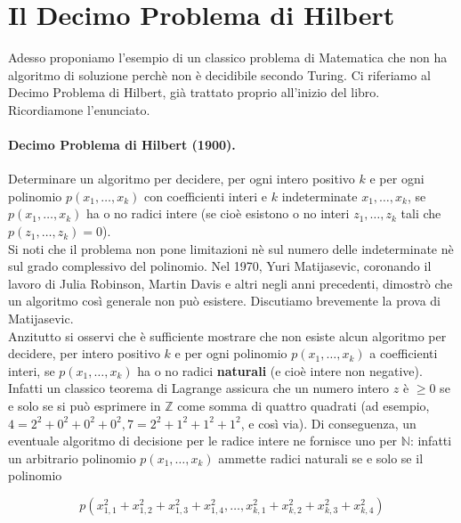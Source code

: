 \section{Il Decimo Problema di Hilbert}

Adesso proponiamo l'esempio di un classico problema di Matematica che non ha
algoritmo di soluzione perchè non è decidibile secondo Turing. Ci riferiamo al Decimo
Problema di Hilbert, già trattato proprio all'inizio del libro. Ricordiamone
l'enunciato.

\paragraph{Decimo Problema di Hilbert (1900).}
Determinare un algoritmo per decidere, per ogni intero positivo $k$ e per ogni
polinomio $p\left(x_1, \ldots, x_k\right)$ con coefficienti interi e $k$
indeterminate $x_1, \ldots, x_k$, se $p\left(x_1, \ldots, x_k\right)$ ha o no radici
intere (se cioè esistono o no interi $z_1, \ldots, z_k$ tali che $p\left(z_1, \ldots,
    z_k\right)=0$).\\

Si noti che il problema non pone limitazioni nè sul numero delle indeterminate nè sul
grado complessivo del polinomio. Nel 1970, Yuri Matijasevic, coronando il lavoro di
Julia Robinson, Martin Davis e altri negli anni precedenti, dimostrò che un algoritmo
così generale non può esistere. Discutiamo brevemente la prova di Matijasevic.\\
Anzitutto si osservi che è sufficiente mostrare che non esiste alcun algoritmo per
decidere, per intero positivo $k$ e per ogni polinomio $p\left(x_1, \ldots,
    x_k\right)$ a coefficienti interi, se $p\left(x_1, \ldots, x_k\right)$ ha o no radici
\textbf{naturali} (e cioè intere non negative). Infatti un classico teorema di Lagrange
assicura che un numero intero $z$ è $\geq 0$ se e solo se si può esprimere in
$\mathbb{Z}$ come somma di quattro quadrati (ad esempio, $4=2^2+0^2+0^2+0^2,
    7=2^2+1^2+1^2+1^2$, e così via). Di conseguenza, un eventuale algoritmo di decisione
per le radice intere ne fornisce uno per $\mathbb{N}$: infatti un arbitrario
polinomio $p\left(x_1, \ldots, x_k\right)$ ammette radici naturali se e solo se il
polinomio

\[
    p\left(x_{1,1}^2+x_{1,2}^2+x_{1,3}^2+x_{1,4}^2, \ldots, x_{k, 1}^2+x_{k, 2}^2+x_{k, 3}^2+x_{k, 4}^2\right)
\]

